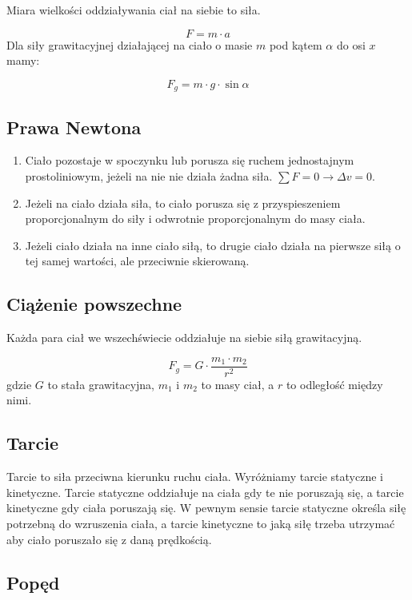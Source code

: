 \documentclass{../notatki}
\begin{document}
Miara wielkości oddziaływania ciał na siebie to siła.

$$
F = m \cdot a
$$
Dla siły grawitacyjnej działającej na ciało o masie $m$ pod kątem
$\alpha$ do osi $x$ mamy:

$$
F_g = m \cdot g \cdot \sin \alpha
$$

\subsection{Prawa Newtona}

\begin{enumerate}
  \item Ciało pozostaje w spoczynku lub porusza się ruchem jednostajnym
    prostoliniowym, jeżeli na nie nie działa żadna siła. $\sum F = 0
    \rightarrow \Delta v = 0$.
  \item Jeżeli na ciało działa siła, to ciało porusza się z przyspieszeniem
    proporcjonalnym do siły i odwrotnie proporcjonalnym do masy ciała.
  \item Jeżeli ciało działa na inne ciało siłą, to drugie ciało działa na
    pierwsze siłą o tej samej wartości, ale przeciwnie skierowaną.
\end{enumerate}

\subsection{Ciążenie powszechne}

Każda para ciał we wszechświecie oddziałuje na siebie siłą grawitacyjną.

$$
F_g = G \cdot \frac{m_1 \cdot m_2}{r^2}
$$
gdzie $G$ to stała grawitacyjna, $m_1$ i $m_2$ to masy ciał, a $r$ to odległość
między nimi.

\subsection{Tarcie}

Tarcie to siła przeciwna kierunku ruchu ciała. Wyróżniamy tarcie statyczne i
kinetyczne. Tarcie statyczne oddziałuje na ciała gdy te nie poruszają się, a
tarcie kinetyczne gdy ciała poruszają się. W pewnym sensie tarcie statyczne
określa siłę potrzebną do wzruszenia ciała, a tarcie kinetyczne to jaką siłę
trzeba utrzymać aby ciało poruszało się z daną prędkością.

\subsection{Popęd}
\end{document}
